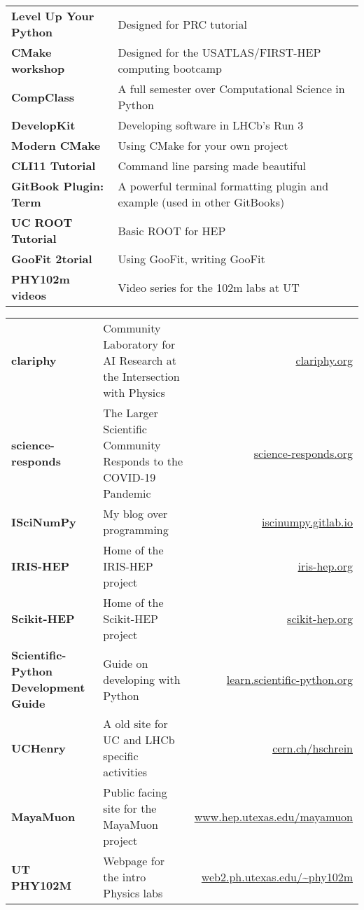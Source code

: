 \documentclass[10pt,letterpaper]{moderncv}
\begin{document}
\begin{tabularx}{\textwidth}{>{\bfseries}p{1.6in}X}
Level Up Your Python & Designed for PRC tutorial \\
CMake workshop & Designed for the USATLAS/FIRST-HEP computing bootcamp \\
CompClass & A full semester over Computational Science in Python \\
DevelopKit & Developing software in LHCb's Run 3 \\
Modern CMake & Using CMake for your own project \\
CLI11 Tutorial & Command line parsing made beautiful \\
GitBook Plugin: Term & A powerful terminal formatting plugin and example (used in other GitBooks) \\
UC ROOT Tutorial & Basic ROOT for HEP \\
GooFit 2torial & Using GooFit, writing GooFit \\
PHY102m videos & Video series for the 102m labs at UT \\
\end{tabularx}


\begin{tabularx}{\textwidth}{>{\bfseries}p{1.45in}Xr}
clariphy & Community Laboratory for AI Research at the Intersection with Physics & \url{clariphy.org} \\
science-responds & The Larger Scientific Community Responds to the COVID-19 Pandemic & \url{science-responds.org} \\
ISciNumPy & My blog over programming & \url{iscinumpy.gitlab.io} \\
IRIS-HEP & Home of the IRIS-HEP project & \url{iris-hep.org} \\
Scikit-HEP & Home of the Scikit-HEP project & \url{scikit-hep.org} \\
Scientific-Python Development Guide & Guide on developing with Python & \url{learn.scientific-python.org} \\
UCHenry & A old site for UC and LHCb specific activities & \url{cern.ch/hschrein}  \\
MayaMuon & Public facing site for the MayaMuon project & \url{www.hep.utexas.edu/mayamuon} \\
UT PHY102M & Webpage for the intro Physics labs & \url{web2.ph.utexas.edu/~phy102m}  \\
\end{tabularx}
\end{document}
